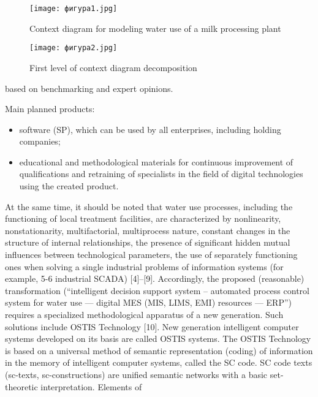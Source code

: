 \documentclass[a4paper]{article}
\begin{document}
\begin{figure}[H]
    \centering
    \texttt{[image: фигура1.jpg]}
   \caption{Context diagram for modeling water use of a milk processing plant}
   \label{Fig. 1}
\end{figure}

\begin{figure}[H]
    \centering
    \texttt{[image: фигура2.jpg]}
    \caption{First level of context diagram decomposition}
     \label{Fig. 2}
\end{figure}

\begin{multicols}{2}
\fontsize{10}{13}\selectfont
    based on benchmarking and expert opinions.\par Main planned products:
    \begin{itemize}[leftmargin=7mm]

    \item software (SP), which can be used by all enterprises,
including holding companies;
\item\nohyphens{ educational and methodological materials for continuous improvement of qualifications and retraining of
specialists in the field of digital technologies using
the created product.}
    \end{itemize}
    \nohyphens {At the same time, it should be noted that water use
processes, including the functioning of local treatment
facilities, are characterized by nonlinearity, nonstationarity, multifactorial, multiprocess nature, constant changes
in the structure of internal relationships, the presence of
significant hidden mutual influences between technological parameters, the use of separately functioning ones
when solving a single industrial problems of information
systems (for example, 5-6 industrial SCADA) [4]–[9].\vskip 0.2cm
Accordingly, the proposed (reasonable) transformation
(“intelligent decision support system – automated process
control system for water use — digital MES (MIS,
LIMS, EMI) resources — ERP”) requires a specialized
methodological apparatus of a new generation. \vskip 0.2cm
Such solutions include OSTIS Technology [10]. New
generation intelligent computer systems developed on its
basis are called OSTIS systems. The OSTIS Technology
is based on a universal method of semantic representation
(coding) of information in the memory of intelligent
computer systems, called the SC code. SC code texts
(sc-texts, sc-constructions) are unified semantic networks
with a basic set-theoretic interpretation. Elements of}
\end{multicols}
\newpage
\end{document}
